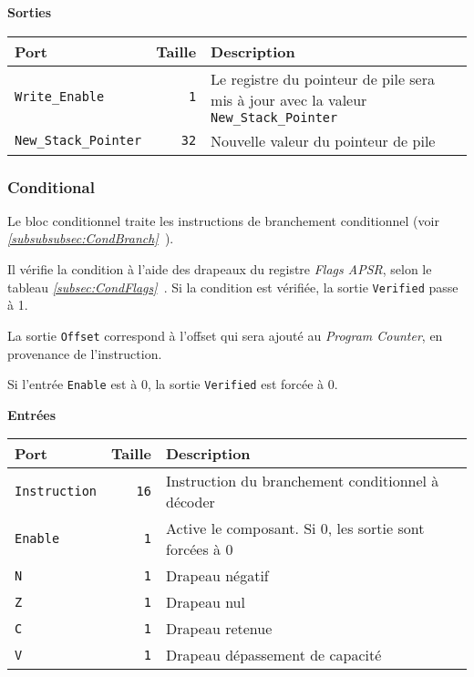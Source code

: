 \vspace{1em}
\textbf{Sorties}\\

\begin{tabular}{|l|r|l|}
\hline 
\textbf{Port} & \textbf{Taille} & \textbf{Description}\\
\hline

\hline
\texttt{Write\_Enable}		&  \texttt{1} & Le registre du pointeur de pile sera mis à jour avec la valeur \texttt{New\_Stack\_Pointer}\\
\hline
\texttt{New\_Stack\_Pointer}	& \texttt{32} & Nouvelle valeur du pointeur de pile\\

\hline
\end{tabular}




\subsubsection{Conditional}


Le bloc conditionnel traite les instructions de branchement conditionnel (voir \textit{\ref{subsubsubsec:CondBranch}~}).

Il vérifie la condition à l'aide des drapeaux du registre \textit{Flags APSR}, selon le tableau  \textit{\ref{subsec:CondFlags}~}.
Si la condition est vérifiée, la sortie \texttt{Verified} passe à 1.

La sortie \texttt{Offset} correspond à l'offset qui sera ajouté au \textit{Program Counter}, en provenance de l'instruction.

Si l'entrée \texttt{Enable} est à 0, la sortie \texttt{Verified} est forcée à 0.


\textbf{Entrées}\\

\begin{tabular}{|l|r|l|}
\hline
\textbf{Port}		& \textbf{Taille} & \textbf{Description}\\
\hline

\texttt{Instruction}	& \texttt{16} & Instruction du branchement conditionnel à décoder\\
\hline
\texttt{Enable}		&  \texttt{1} & Active le composant. Si 0, les sortie sont forcées à 0\\
\hline
\texttt{N}		&  \texttt{1} & Drapeau négatif\\
\hline
\texttt{Z}		&  \texttt{1} & Drapeau nul\\
\hline
\texttt{C}		&  \texttt{1} & Drapeau retenue\\
\hline
\texttt{V}		&  \texttt{1} & Drapeau dépassement de capacité\\


\hline
\end{tabular}

